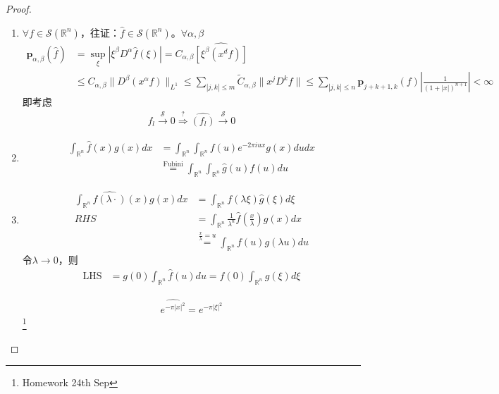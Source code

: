 \begin{proof}
    \begin{enumerate}[leftmargin=1cm, label=\arabic*]
        \item $\forall f\in\mathcal{S}(\mathbb{R}^n)$，往证：$\hat{f}\in\mathcal{S}(\mathbb{R}^n)$。$\forall \alpha,\beta$
        \begin{align*}
            \boldsymbol{p}_{\alpha,\beta} (\hat{f}) &= \sup\limits_{\xi} |\xi^{\beta} D^{\alpha} \hat{f}(\xi)| = C_{\alpha,\beta}\widehat{[\xi^{\beta} (x^d f)]} \\
            & \leqslant C_{\alpha,\beta} \|D^{\beta} (x^{\alpha} f)\|_{L^1} \leqslant \sum\limits_{|j,k|\leqslant m} \tilde{C}_{\alpha,\beta} \|x^j D^k f\| \leqslant \sum\limits_{|j,k|\leqslant n} \boldsymbol{p}_{j+k+1,k}(f) \left|\frac{1}{(1+|x|)^{n+1}}\right| < \infty
        \end{align*}
        即考虑
        \begin{align*}
            f_l \xrightarrow{\mathcal{S}} 0 \overset{?}{\Rightarrow} \widehat{(f_l)} \xrightarrow{\mathcal{S}} 0
        \end{align*}

        \item 
        \begin{align*}
            \int_{\mathbb{R}^n} \hat{f}(x) g(x) dx &= \int_{\mathbb{R}^n} \int_{\mathbb{R}^n} f(u) e^{-2\pi i u x} g(x) du dx \\
            & \overset{\text{Fubini}}{=} \int_{\mathbb{R}^n} \int_{\mathbb{R}^n} \hat{g}(u) f(u) du
        \end{align*}

        \item 
        \begin{align*}
            \int_{\mathbb{R}^n} \widehat{f(\lambda\cdot)}(x) g(x) dx & = \int_{\mathbb{R}^n} f(\lambda\xi) \hat{g}(\xi) d\xi \\
            RHS &= \int_{\mathbb{R}^n} \frac{1}{\lambda^n} \hat{f}\left(\frac{x}{\lambda}\right) g(x) dx \\
            &\overset{\frac{x}{\lambda} = u}{=} \int_{\mathbb{R}^n} f(u)g(\lambda u) du
        \end{align*}
        令$\lambda\to 0$，则
        \begin{align*}
            \operatorname{LHS} &= g(0) \int_{\mathbb{R}^n} \hat{f}(u) du = f(0) \int_{\mathbb{R}^n} \hat{g}(\xi) d\xi
        \end{align*}

        \begin{lemma}
            \begin{align*}
                \widehat{e^{-\pi |x|^2}} = e^{-\pi |\xi|^2}
            \end{align*} \footnote{Homework 24th Sep}
        \end{lemma}
        

\end{enumerate}
\end{proof}
